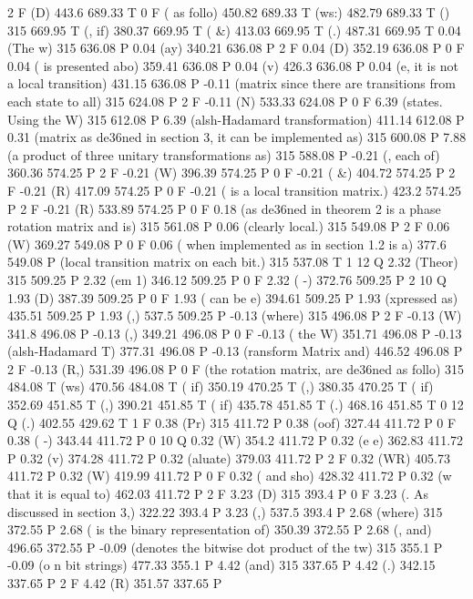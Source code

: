 2 F
(D) 443.6 689.33 T
0 F
( as follo) 450.82 689.33 T
(ws:) 482.79 689.33 T
() 315 669.95 T
(, if) 380.37 669.95 T
( &) 413.03 669.95 T
(.) 487.31 669.95 T
0.04 (The w) 315 636.08 P
0.04 (ay) 340.21 636.08 P
2 F
0.04 (D) 352.19 636.08 P
0 F
0.04 ( is presented abo) 359.41 636.08 P
0.04 (v) 426.3 636.08 P
0.04 (e, it is not a local transition) 431.15 636.08 P
-0.11 (matrix since there are transitions from each state to all) 315 624.08 P
2 F
-0.11 (N) 533.33 624.08 P
0 F
6.39 (states. Using the W) 315 612.08 P
6.39 (alsh-Hadamard transformation) 411.14 612.08 P
0.31 (matrix as de\336ned in section 3, it can be implemented as) 315 600.08 P
7.88 (a product of three unitary transformations as) 315 588.08 P
-0.21 (, each of) 360.36 574.25 P
2 F
-0.21 (W) 396.39 574.25 P
0 F
-0.21 ( &) 404.72 574.25 P
2 F
-0.21 (R) 417.09 574.25 P
0 F
-0.21 ( is a local transition matrix.) 423.2 574.25 P
2 F
-0.21 (R) 533.89 574.25 P
0 F
0.18 (as de\336ned in theorem 2 is a phase rotation matrix and is) 315 561.08 P
0.06 (clearly local.) 315 549.08 P
2 F
0.06 (W) 369.27 549.08 P
0 F
0.06 ( when implemented as in section 1.2 is a) 377.6 549.08 P
(local transition matrix on each bit.) 315 537.08 T
1 12 Q
2.32 (Theor) 315 509.25 P
2.32 (em 1) 346.12 509.25 P
0 F
2.32 ( -) 372.76 509.25 P
2 10 Q
1.93 (D) 387.39 509.25 P
0 F
1.93 ( can be e) 394.61 509.25 P
1.93 (xpressed as) 435.51 509.25 P
1.93 (,) 537.5 509.25 P
-0.13 (where) 315 496.08 P
2 F
-0.13 (W) 341.8 496.08 P
-0.13 (,) 349.21 496.08 P
0 F
-0.13 ( the W) 351.71 496.08 P
-0.13 (alsh-Hadamard T) 377.31 496.08 P
-0.13 (ransform Matrix and) 446.52 496.08 P
2 F
-0.13 (R,) 531.39 496.08 P
0 F
(the rotation matrix, are de\336ned as follo) 315 484.08 T
(ws) 470.56 484.08 T
( if) 350.19 470.25 T
(,) 380.35 470.25 T
( if) 352.69 451.85 T
(,) 390.21 451.85 T
( if) 435.78 451.85 T
(.) 468.16 451.85 T
0 12 Q
(.) 402.55 429.62 T
1 F
0.38 (Pr) 315 411.72 P
0.38 (oof) 327.44 411.72 P
0 F
0.38 ( -) 343.44 411.72 P
0 10 Q
0.32 (W) 354.2 411.72 P
0.32 (e e) 362.83 411.72 P
0.32 (v) 374.28 411.72 P
0.32 (aluate) 379.03 411.72 P
2 F
0.32 (WR) 405.73 411.72 P
0.32 (W) 419.99 411.72 P
0 F
0.32 ( and sho) 428.32 411.72 P
0.32 (w that it is equal to) 462.03 411.72 P
2 F
3.23 (D) 315 393.4 P
0 F
3.23 (. As discussed in section 3,) 322.22 393.4 P
3.23 (,) 537.5 393.4 P
2.68 (where) 315 372.55 P
2.68 ( is the binary representation of) 350.39 372.55 P
2.68 (, and) 496.65 372.55 P
-0.09 (denotes the bitwise dot product of the tw) 315 355.1 P
-0.09 (o n bit strings) 477.33 355.1 P
4.42 (and) 315 337.65 P
4.42 (.) 342.15 337.65 P
2 F
4.42 (R) 351.57 337.65 P
